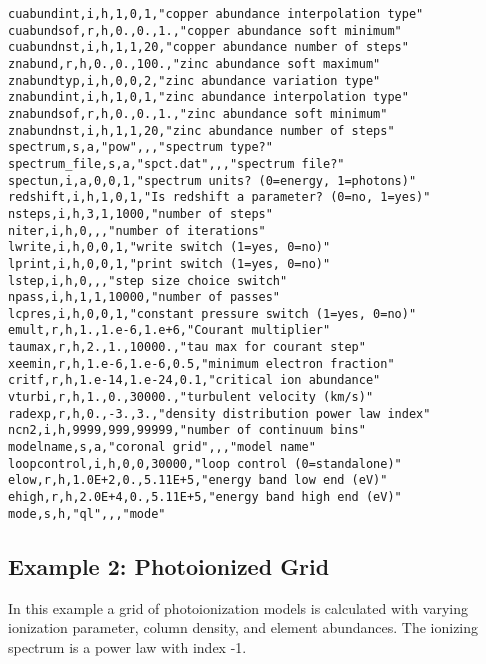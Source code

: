 \begin{verbatim}
cuabundint,i,h,1,0,1,"copper abundance interpolation type"
cuabundsof,r,h,0.,0.,1.,"copper abundance soft minimum"
cuabundnst,i,h,1,1,20,"copper abundance number of steps"
znabund,r,h,0.,0.,100.,"zinc abundance soft maximum"
znabundtyp,i,h,0,0,2,"zinc abundance variation type"
znabundint,i,h,1,0,1,"zinc abundance interpolation type"
znabundsof,r,h,0.,0.,1.,"zinc abundance soft minimum"
znabundnst,i,h,1,1,20,"zinc abundance number of steps"
spectrum,s,a,"pow",,,"spectrum type?"
spectrum_file,s,a,"spct.dat",,,"spectrum file?"
spectun,i,a,0,0,1,"spectrum units? (0=energy, 1=photons)"
redshift,i,h,1,0,1,"Is redshift a parameter? (0=no, 1=yes)"
nsteps,i,h,3,1,1000,"number of steps"
niter,i,h,0,,,"number of iterations"
lwrite,i,h,0,0,1,"write switch (1=yes, 0=no)"
lprint,i,h,0,0,1,"print switch (1=yes, 0=no)"
lstep,i,h,0,,,"step size choice switch"
npass,i,h,1,1,10000,"number of passes"
lcpres,i,h,0,0,1,"constant pressure switch (1=yes, 0=no)"
emult,r,h,1.,1.e-6,1.e+6,"Courant multiplier"
taumax,r,h,2.,1.,10000.,"tau max for courant step"
xeemin,r,h,1.e-6,1.e-6,0.5,"minimum electron fraction"
critf,r,h,1.e-14,1.e-24,0.1,"critical ion abundance"
vturbi,r,h,1.,0.,30000.,"turbulent velocity (km/s)"
radexp,r,h,0.,-3.,3.,"density distribution power law index"
ncn2,i,h,9999,999,99999,"number of continuum bins"
modelname,s,a,"coronal grid",,,"model name"
loopcontrol,i,h,0,0,30000,"loop control (0=standalone)"
elow,r,h,1.0E+2,0.,5.11E+5,"energy band low end (eV)"
ehigh,r,h,2.0E+4,0.,5.11E+5,"energy band high end (eV)"
mode,s,h,"ql",,,"mode"
\end{verbatim}


\subsection{Example 2: Photoionized Grid}

In this example a grid of photoionization models is calculated 
with varying ionization parameter, column density, and element 
abundances.  The ionizing spectrum is a power law with index -1.


